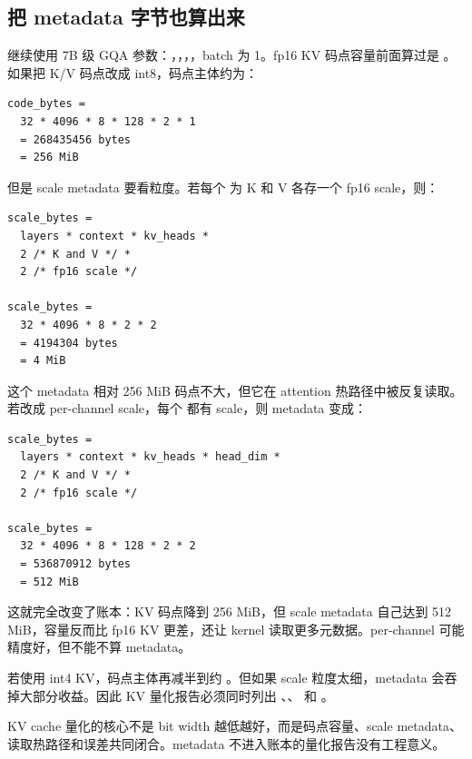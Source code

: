 \subsection{把 metadata 字节也算出来}

继续使用 7B 级 GQA 参数：，，，，batch 为 1。fp16 KV 码点容量前面算过是 。如果把 K/V 码点改成 int8，码点主体约为：

\begin{lstlisting}[numbers=none,caption={int8 KV 码点主体容量}]
code_bytes =
  32 * 4096 * 8 * 128 * 2 * 1
  = 268435456 bytes
  = 256 MiB
\end{lstlisting}

但是 scale metadata 要看粒度。若每个  为 K 和 V 各存一个 fp16 scale，则：

\begin{lstlisting}[numbers=none,caption={per-token-per-head fp16 scale 容量}]
scale_bytes =
  layers * context * kv_heads *
  2 /* K and V */ *
  2 /* fp16 scale */

scale_bytes =
  32 * 4096 * 8 * 2 * 2
  = 4194304 bytes
  = 4 MiB
\end{lstlisting}

这个 metadata 相对 256 MiB 码点不大，但它在 attention 热路径中被反复读取。若改成 per-channel scale，每个  都有 scale，则 metadata 变成：

\begin{lstlisting}[numbers=none,caption={per-token-per-channel fp16 scale 容量}]
scale_bytes =
  layers * context * kv_heads * head_dim *
  2 /* K and V */ *
  2 /* fp16 scale */

scale_bytes =
  32 * 4096 * 8 * 128 * 2 * 2
  = 536870912 bytes
  = 512 MiB
\end{lstlisting}

这就完全改变了账本：KV 码点降到 256 MiB，但 scale metadata 自己达到 512 MiB，容量反而比 fp16 KV 更差，还让 kernel 读取更多元数据。per-channel 可能精度好，但不能不算 metadata。

若使用 int4 KV，码点主体再减半到约 。但如果 scale 粒度太细，metadata 会吞掉大部分收益。因此 KV 量化报告必须同时列出 、、 和 。

\begin{keyidea}
KV cache 量化的核心不是 bit width 越低越好，而是码点容量、scale metadata、读取热路径和误差共同闭合。metadata 不进入账本的量化报告没有工程意义。
\end{keyidea}

